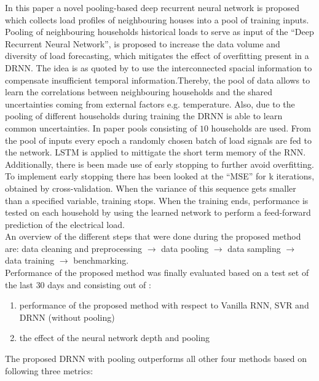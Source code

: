 In this paper \cite{Shi2018} a novel pooling-based deep recurrent neural network is proposed which collects load profiles of neighbouring houses into a pool of training inputs. Pooling of neighbouring households historical loads to serve as input of the ``Deep Recurrent Neural Network'', is proposed to increase the data volume and diversity of load forecasting, which mitigates the effect of overfitting present in a DRNN. The idea is as quoted by \cite{Shi2018} to use the interconnected spacial information to compensate insufficient temporal information.Thereby, the pool of data allows to learn the correlations between neighbouring households and the shared uncertainties coming from external factors e.g. temperature.  Also, due to the pooling of different households during training the DRNN is able to learn common uncertainties. In paper \cite{Shi2018} pools consisting of $ 10 $ households are used. From the pool of inputs every epoch a randomly chosen batch of load signals are fed to the network. LSTM is applied to mittigate the short term memory of the RNN. Additionally, there is been made use of early stopping to further avoid overfitting. To implement early stopping there has been looked at the ``MSE'' for k iterations, obtained by cross-validation. When the variance of this sequence gets smaller than a specified variable, training stops. When the training ends, performance is tested on each household by using the learned network to perform a feed-forward prediction of the electrical load.\\

An overview of the different steps that were done during the proposed method are: data cleaning and preprocessing $\rightarrow$ data pooling $\rightarrow$ data sampling $\rightarrow$ data training $\rightarrow$ benchmarking.\\

Performance of the proposed method was finally evaluated based on a test set of the last $ 30 $ days and consisting out of : 
\begin{enumerate}
	\item performance of the proposed method with respect to Vanilla RNN, SVR and DRNN (without pooling)
	\item the effect of the neural network depth and pooling
\end{enumerate}

The proposed DRNN with pooling outperforms all other four methods based on following three metrics:

